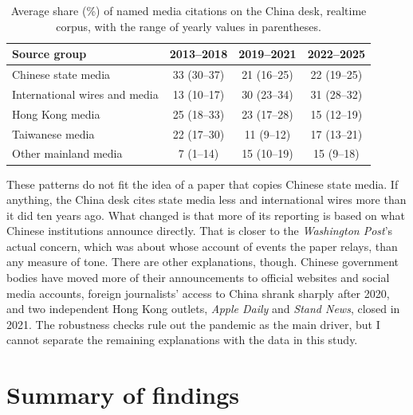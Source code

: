 \documentclass[11pt]{article}
\begin{document}
\begin{table}[tbp]
\centering
\small
\begin{tabular}{@{}lccc@{}}
\toprule
Source group & 2013--2018 & 2019--2021 & 2022--2025 \\
\midrule
Chinese state media & 33 (30--37) & 21 (16--25) & 22 (19--25) \\
International wires and media & 13 (10--17) & 30 (23--34) & 31 (28--32) \\
Hong Kong media & 25 (18--33) & 23 (17--28) & 15 (12--19) \\
Taiwanese media & 22 (17--30) & 11 (9--12) & 17 (13--21) \\
Other mainland media & 7 (1--14) & 15 (10--19) & 15 (9--18) \\
\bottomrule
\end{tabular}
\caption{Average share (\%) of named media citations on the China desk, realtime corpus, with the range of yearly values in parentheses.}
\label{tab:shares}
\end{table}

These patterns do not fit the idea of a paper that copies Chinese state media. If anything, the China desk cites state media less and international wires more than it did ten years ago. What changed is that more of its reporting is based on what Chinese institutions announce directly. That is closer to the \textit{Washington Post}'s actual concern, which was about whose account of events the paper relays, than any measure of tone. There are other explanations, though. Chinese government bodies have moved more of their announcements to official websites and social media accounts, foreign journalists' access to China shrank sharply after 2020, and two independent Hong Kong outlets, \textit{Apple Daily} and \textit{Stand News}, closed in 2021. The robustness checks rule out the pandemic as the main driver, but I cannot separate the remaining explanations with the data in this study.

\section{Summary of findings}
\end{document}
